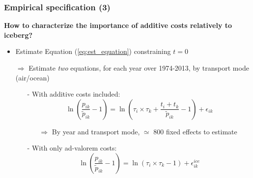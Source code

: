 \documentclass[10 pt,Helvetica, french]{beamer}
\begin{document}
\begin{frame}
\frametitle{Empirical specification (3)}
\textbf{How to characterize the importance of additive costs relatively to iceberg?} \vspace{0.1cm}
\begin{itemize}
\item Estimate Equation (\ref{eq:est_equation}) constraining $t=0$ \vspace{0.1cm}
\item[$\Rightarrow$] Estimate \textit{two} equations, for each year over 1974-2013, by transport mode (air/ocean)\vspace{0.1cm}
\begin{itemize}
\item[-] With additive costs included:
\begin{equation}
\ln\left(\frac{p_{ik}}{\widetilde{p}_{ik}}-1 \right)= \ln \left(\tau_{i} \times \tau_{k}+\frac{t_{i} + t_{k}}{\widetilde{p}_{ik}}-1 \right) + \epsilon_{ik}
\end{equation}
\begin{itemize}
\item[$\Rightarrow$] By year and transport mode, $\simeq$ 800 fixed effects to estimate   \vspace{0.1cm}
\end{itemize}
\item[-] With only ad-valorem costs:
\begin{equation}
\ln\left(\frac{p_{ik}}{\widetilde{p}_{ik}}-1 \right)= \ln \left(\tau_{i} \times \tau_{k}-1 \right) + \epsilon^{ice}_{ik} \label{eq:model_nlI}
\end{equation}
\end{itemize}
\end{itemize}
\end{frame}
\end{document}
